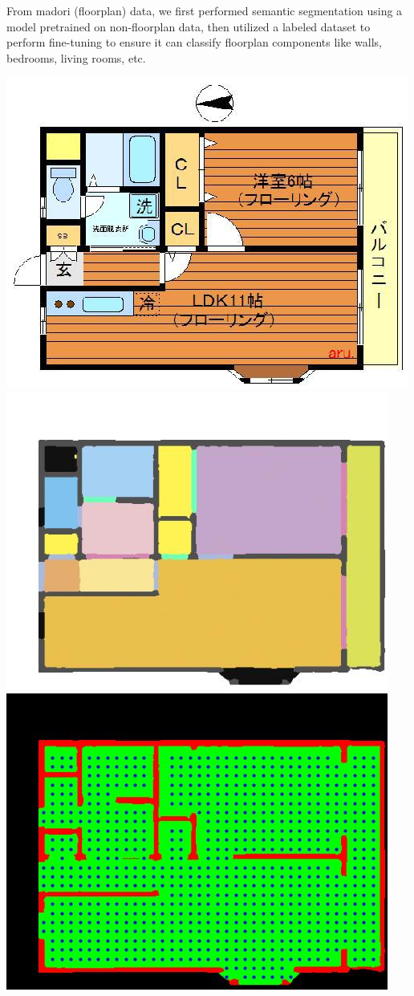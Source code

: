 \documentclass[11pt,a4paper]{article}
\begin{document}
\begin{multicols}{2}
From madori (floorplan) data, we first performed semantic segmentation using a model pretrained on non-floorplan 
data, then utilized a labeled dataset to perform fine-tuning to ensure it can classify floorplan components like 
walls, bedrooms, living rooms, etc. 
\begin{flushleft}
    \includegraphics[width=0.7\columnwidth]{plots/exp_maodri_semseg_raw.jpg}
    \includegraphics[width=0.7\columnwidth]{plots/exp_madori_semseg_decoded.jpg}
    \includegraphics[width=0.7\columnwidth]{plots/exp_madori_semseg_grid.jpg}

\end{flushleft}
\end{multicols}
\end{document}
